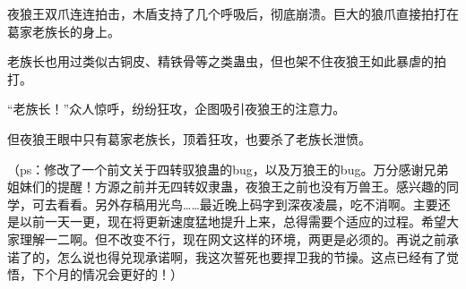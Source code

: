 \begin{this_body}
夜狼王双爪连连拍击，木盾支持了几个呼吸后，彻底崩溃。巨大的狼爪直接拍打在葛家老族长的身上。

老族长也用过类似古铜皮、精铁骨等之类蛊虫，但也架不住夜狼王如此暴虐的拍打。

“老族长！”众人惊呼，纷纷狂攻，企图吸引夜狼王的注意力。

但夜狼王眼中只有葛家老族长，顶着狂攻，也要杀了老族长泄愤。

（ps：修改了一个前文关于四转驭狼蛊的bug，以及万狼王的bug。万分感谢兄弟姐妹们的提醒！方源之前并无四转奴隶蛊，夜狼王之前也没有万兽王。感兴趣的同学，可去看看。另外存稿用光鸟……最近晚上码字到深夜凌晨，吃不消啊。主要还是以前一天一更，现在将更新速度猛地提升上来，总得需要个适应的过程。希望大家理解一二啊。但不改变不行，现在网文这样的环境，两更是必须的。再说之前承诺了的，怎么说也得兑现承诺啊，我这次誓死也要捍卫我的节操。这点已经有了觉悟，下个月的情况会更好的！）

\end{this_body}

